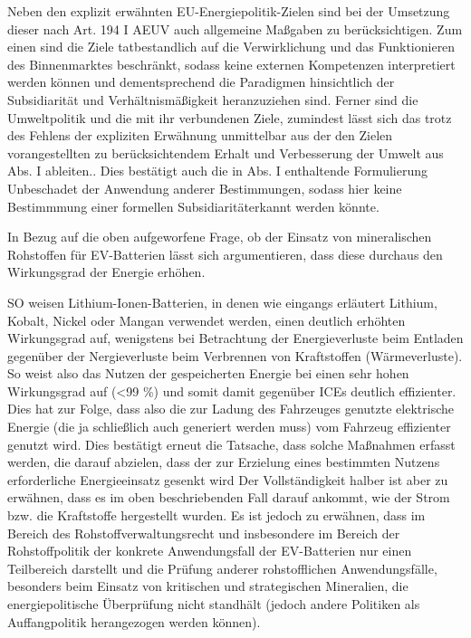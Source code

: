 \documentclass[12pt,a4paper,oneside]{book} %
\begin{document}
	Neben den explizit erwähnten EU-Energiepolitik-Zielen sind bei der Umsetzung dieser nach Art. 194 I AEUV auch allgemeine Maßgaben zu berücksichtigen. Zum einen sind die Ziele \glqq tatbestandlich auf die Verwirklichung und das Funktionieren des Binnenmarktes beschränkt\grqq \autocite{Bings in Streinz, Art. 194 Rn. 32f.}, sodass keine externen Kompetenzen interpretiert werden können\autocite{Bings in Streinz, Art. 194 Rn. 33} und dementsprechend die Paradigmen hinsichtlich der Subsidiarität und Verhältnismäßigkeit heranzuziehen sind. Ferner sind die Umweltpolitik und die mit ihr verbundenen Ziele, zumindest lässt sich das trotz des Fehlens der expliziten Erwähnung unmittelbar aus der den Zielen vorangestellten zu berücksichtendem Erhalt und Verbesserung der Umwelt aus Abs. I ableiten.\autocite{Bings in Streinz, Art. 194 Rn. 33}. Dies bestätigt auch die in Abs. I enthaltende Formulierung \glqq Unbeschadet der Anwendung anderer Bestimmungen\grqq, sodass hier keine Bestimmmung einer \glqq formellen Subsidiarität\grqq erkannt werden könnte.\autocite{Nettesheim, Grabitz/Hilf/nettesheim AEUV Art. 194, Rn 35}
	
	In Bezug auf die oben aufgeworfene Frage, ob der Einsatz von mineralischen Rohstoffen für EV-Batterien lässt sich argumentieren, dass diese durchaus den Wirkungsgrad der Energie erhöhen. 
	
	SO weisen Lithium-Ionen-Batterien, in denen wie eingangs erläutert Lithium, Kobalt, Nickel oder Mangan verwendet werden, einen deutlich erhöhten Wirkungsgrad auf, wenigstens bei Betrachtung der Energieverluste beim Entladen gegenüber der Nergieverluste beim Verbrennen von Kraftstoffen (Wärmeverluste). So weist also das Nutzen der gespeicherten Energie bei einen sehr hohen Wirkungsgrad auf (<99 \%) und somit damit gegenüber ICEs deutlich effizienter.%
	Dies hat zur Folge, dass also die zur Ladung des Fahrzeuges genutzte elektrische Energie (die ja schließlich auch generiert werden muss) vom Fahrzeug effizienter genutzt wird. Dies bestätigt erneut die Tatsache, dass solche Maßnahmen erfasst werden, die \glqq darauf abzielen, dass der zur Erzielung eines bestimmten Nutzens erforderliche Energieeinsatz gesenkt wird\grqq\autocite{Nettesheim in Grabitz/Hilf, AEUV Art. 194, Rn. 17}
	Der Vollständigkeit halber ist aber zu erwähnen, dass es im oben beschriebenden Fall darauf ankommt, wie der Strom bzw. die Kraftstoffe hergestellt wurden.
	Es ist jedoch zu erwähnen, dass im Bereich des Rohstoffverwaltungsrecht und insbesondere im Bereich der Rohstoffpolitik der konkrete Anwendungsfall der EV-Batterien nur einen Teilbereich darstellt und die Prüfung anderer rohstofflichen Anwendungsfälle, besonders beim Einsatz von kritischen und strategischen Mineralien, die energiepolitische Überprüfung nicht standhält (jedoch andere Politiken als Auffangpolitik herangezogen werden können).
	
\end{document}
